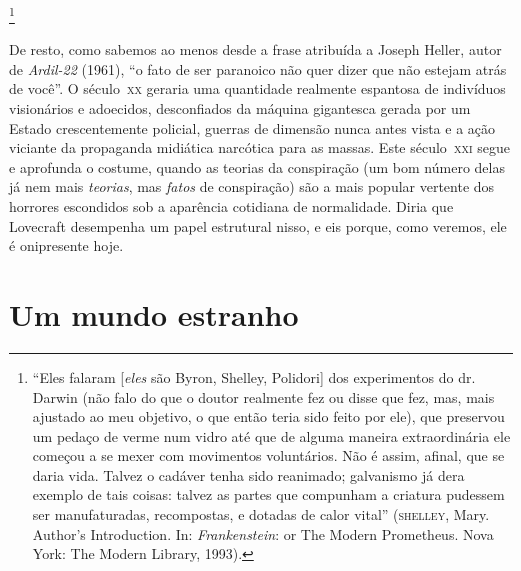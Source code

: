\footnote{``Eles falaram [\emph{eles} são Byron,
  Shelley, Polidori] dos experimentos do dr.\,Darwin (não falo do que
  o doutor realmente fez ou disse que fez, mas, mais ajustado ao meu
  objetivo, o que então teria sido feito por ele), que preservou um
  pedaço de verme num vidro até que de alguma maneira extraordinária
  ele começou a se mexer com movimentos voluntários. Não é assim, afinal,
  que se daria vida. Talvez o cadáver tenha sido reanimado; galvanismo
  já dera exemplo de tais coisas: talvez as partes que compunham a
  criatura pudessem ser manufaturadas, recompostas, e dotadas de calor
  vital'' (\textsc{shelley}, Mary. Author's Introduction. In: 
  \emph{Frankenstein}: or The Modern Prometheus. Nova York: The Modern
  Library, 1993).} 

De resto, como sabemos ao menos desde a frase atribuída a Joseph Heller,
autor de \emph{Ardil-22} (1961), ``o fato de ser
paranoico não quer dizer que não estejam atrás de você''. O século~\textsc{xx}
geraria uma quantidade realmente espantosa de indivíduos visionários e
adoecidos, desconfiados da máquina gigantesca gerada por um Estado
crescentemente policial, guerras de dimensão nunca antes vista e a ação
viciante da propaganda midiática narcótica para as massas. Este século~\textsc{xxi} 
segue e aprofunda o costume, quando as teorias da conspiração (um
bom número delas já nem mais \emph{teorias}, mas \emph{fatos} de
conspiração) são a mais popular vertente dos horrores escondidos sob a
aparência cotidiana de normalidade. Diria que Lovecraft desempenha um
papel estrutural nisso, e eis porque, como veremos, ele é onipresente
hoje.

\section{Um mundo estranho}

